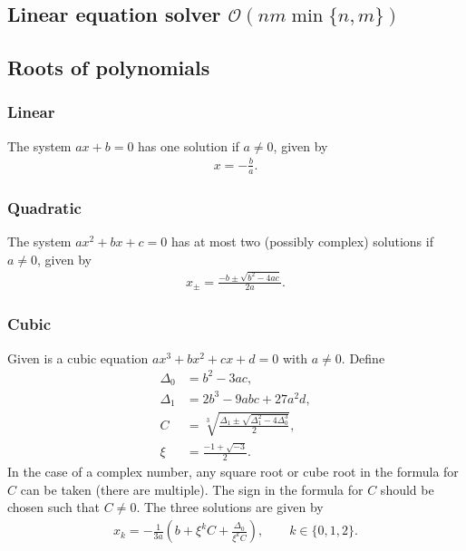 \subsection{Linear equation solver $\mathcal O(nm\min\{n, m\})$}




\subsection{Roots of polynomials}

\subsubsection{Linear}
The system $ax + b = 0$ has one solution if $a \neq 0$, given by
\begin{align*}
    x = - \frac ba.
\end{align*}

\subsubsection{Quadratic}
The system $ax^2 + bx + c = 0$ has at most two (possibly complex) solutions if $a \neq 0$, given by
\begin{align*}
    x_\pm = \frac{-b \pm \sqrt{b^2 - 4ac}}{2a}.
\end{align*}

\subsubsection{Cubic}
Given is a cubic equation $ax^3 + bx^2 + cx + d = 0$ with $a \neq 0$. Define
\begin{align*}
    \Delta_0 &= b^2 - 3ac, \\
    \Delta_1 &= 2b^3 - 9abc + 27a^2d, \\
    C &= \sqrt[3]{\frac{\Delta_1 \pm \sqrt{\Delta_1^2 - 4\Delta_0^3}}2}, \\
    \xi &= \frac{-1 + \sqrt{-3}}2.
\end{align*}
In the case of a complex number, any square root or cube root in the formula for $C$ can be taken (there are multiple). The sign in the formula for $C$ should be chosen such that $C \neq 0$. The three solutions are given by
\begin{align*}
    x_k = -\frac1{3a}\left(b + \xi^kC + \frac{\Delta_0}{\xi^k C}\right), \qquad k \in \{0, 1, 2\}.
\end{align*}





